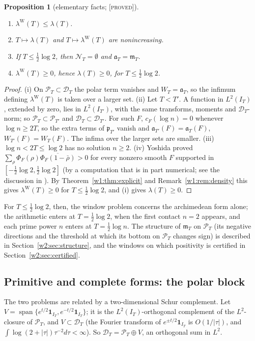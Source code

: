 \documentclass[11pt]{amsart}
\newtheorem{proposition}[theorem]{Proposition}
\theoremstyle{definition}
\theoremstyle{remark}
\numberwithin{equation}{section}
\DeclareMathOperator{\spn}{span}
\newcommand{\IT}{I_T}                                  %
\newcommand{\cF}{c_F}                                  %
\newcommand{\PhiF}{\Phi_F}                             %
\newcommand{\PT}{\mathcal{P}_T}                        %
\newcommand{\DT}{\mathcal{D}_T}                        %
\newcommand{\NT}{\mathcal{N}_T}                        %
\newcommand{\mT}{\mathfrak{m}_T}                       %
\newcommand{\aT}{\mathfrak{a}_T}                       %
\newcommand{\WT}{W_T}                                  %
\newcommand{\lam}{\lambda(T)}                          %
\newcommand{\lamW}{\lambda^{\mathrm W}(T)}             %
\newcommand{\stag}[1]{\textsc{[#1]}}
\newcommand{\PROVED}{\stag{proved}}
\begin{document}
\begin{proposition}[elementary facts; \PROVED]\label{w1:prop:elementary}
\begin{enumerate}[label=(\roman*)]
\item $\lamW\le\lam$.
\item $T\mapsto\lam$ and $T\mapsto\lamW$ are nonincreasing.
\item If $T\le\frac12\log2$, then $\NT=\emptyset$ and $\aT=\mT$.
\item $\lamW\ge0$, hence $\lam\ge0$, for $T\le\frac12\log2$.
\end{enumerate}
\end{proposition}

\begin{proof}
(i) On $\PT\subset\DT$ the polar term vanishes and $\WT=\aT$, so the infimum
defining $\lamW$ is taken over a larger set.
(ii) Let $T<T'$. A function in $L^2(\IT)$, extended by zero, lies in
$L^2(I_{T'})$, with the same transforms, moments and $\DT$-norm; so
$\PT\subset\mathcal P_{T'}$ and $\DT\subset\mathcal D_{T'}$. For such $F$,
$\cF(\log n)=0$ whenever $\log n\ge2T$, so the extra terms of
$\mathfrak p_{T'}$ vanish and $\mathfrak a_{T'}(F)=\aT(F)$,
$W_{T'}(F)=\WT(F)$. The infima over the larger sets are smaller.
(iii) $\log n<2T\le\log 2$ has no solution $n\ge2$.
(iv) Yoshida \cite[Theorem~1]{Yoshida1992} proved
$\sum_\rho\PhiF(\rho)\overline{\PhiF(1-\bar\rho)}>0$ for every nonzero smooth
$F$ supported in $[-\frac12\log2,\frac12\log2]$ (by a computation that is in
part numerical; see the discussion in \cite[Remark~6.3]{P45}). By
Theorem~\ref{w1:thm:explicit} and Remark~\ref{w1:rem:density} this gives
$\lamW\ge0$ for $T\le\frac12\log2$, and (i) gives $\lam\ge0$.
\end{proof}

For $T\le\frac12\log 2$, then, the window problem concerns the archimedean
form alone; the arithmetic enters at $T=\frac12\log2$, when the first contact
$n=2$ appears, and each prime power $n$ enters at $T=\frac12\log n$. The
structure of $\mT$ on $\PT$ (its negative directions and the threshold at
which its bottom on $\PT$ changes sign) is described in
Section~\ref{w2:sec:structure}, and the windows on which positivity is
certified in Section~\ref{w2:sec:certified}.

\subsection{Primitive and complete forms: the polar block}
The two problems are related by a two-dimensional Schur complement. Let
$V=\spn\{e^{t/2}\mathbf 1_{\IT},e^{-t/2}\mathbf 1_{\IT}\}$; it is the
$L^2(\IT)$-orthogonal complement of the $L^2$-closure of $\PT$, and $V\subset\DT$
(the Fourier transform of $e^{\pm t/2}\mathbf 1_{\IT}$ is $O(1/|\tau|)$, and
$\int\log(2+|\tau|)\tau^{-2}d\tau<\infty$). So $\DT=\PT\oplus V$, an
orthogonal sum in $L^2$.
\end{document}
